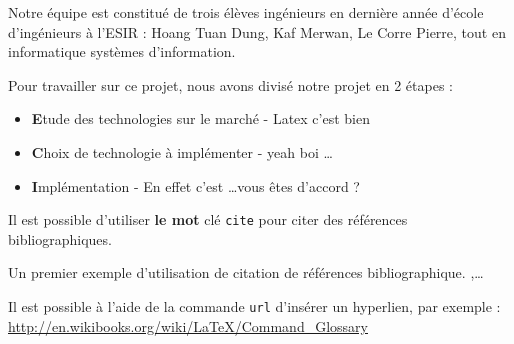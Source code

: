 \documentclass[twocolumn,a4paper]{IEEEtranfr}
\begin{document}

Notre équipe est constitué de trois élèves ingénieurs en dernière année d'école d'ingénieurs à l'ESIR : Hoang Tuan Dung, Kaf Merwan, Le Corre Pierre, tout en informatique systèmes d'information.

Pour travailler sur ce projet, nous avons divisé notre projet en 2 étapes :
\begin{itemize}
  \item {\textbf Etude des technologies sur le marché} - Latex c'est bien 
  \item {\textbf Choix de technologie à implémenter} - yeah boi \dots
  \item {\textbf Implémentation} - En effet c'est \dots vous êtes d'accord ?
\end{itemize}

Il est possible d'utiliser {\color{red}\textbf{le mot}} clé {\tt cite} pour citer des références
bibliographiques.  

Un premier exemple d'utilisation de citation de références bibliographique. 
\cite{akgu07},\cite{akgu091}\cite{zwic00}\cite{loredo_accuracy_2001}\ldots

Il est possible à l'aide de la commande {\tt url{}} d'insérer un
hyperlien, par exemple : \url{http://en.wikibooks.org/wiki/LaTeX/Command_Glossary}
\end{document}
